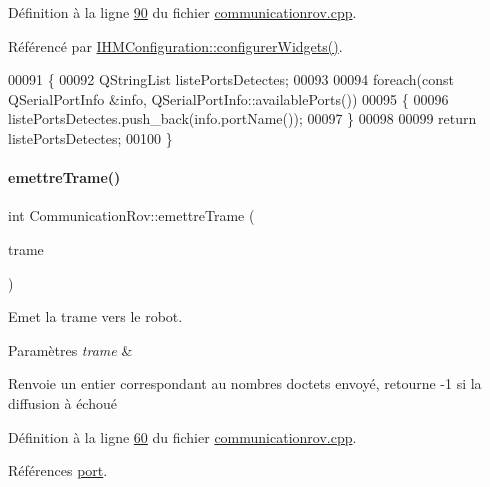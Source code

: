 Définition à la ligne \hyperlink{communicationrov_8cpp_source_l00090}{90} du fichier \hyperlink{communicationrov_8cpp_source}{communicationrov.\+cpp}.



Référencé par \hyperlink{ihmconfiguration_8cpp_source_l00033}{I\+H\+M\+Configuration\+::configurer\+Widgets()}.


\begin{DoxyCode}
00091 \{
00092     QStringList listePortsDetectes;
00093 
00094     \textcolor{keywordflow}{foreach}(\textcolor{keyword}{const} QSerialPortInfo &info, QSerialPortInfo::availablePorts())
00095     \{
00096         listePortsDetectes.push\_back(info.portName());
00097     \}
00098 
00099     \textcolor{keywordflow}{return} listePortsDetectes;
00100 \}
\end{DoxyCode}
\mbox{\label{class_communication_rov_a4f52076db8d6e78abe1745fa1e235272}} 
\paragraph{\texorpdfstring{emettre\+Trame()}{emettreTrame()}}
{\footnotesize\ttfamily int Communication\+Rov\+::emettre\+Trame (\begin{DoxyParamCaption}\item[{Q\+String}]{trame }\end{DoxyParamCaption})}



Emet la trame vers le robot. 


\begin{DoxyParams}{Paramètres}
{\em trame} & \\
\hline
\end{DoxyParams}
\begin{DoxyReturn}{Renvoie}
un entier correspondant au nombres d\textquotesingle{}octets envoyé, retourne -\/1 si la diffusion à échoué 
\end{DoxyReturn}


Définition à la ligne \hyperlink{communicationrov_8cpp_source_l00060}{60} du fichier \hyperlink{communicationrov_8cpp_source}{communicationrov.\+cpp}.



Références \hyperlink{communicationrov_8h_source_l00042}{port}.



